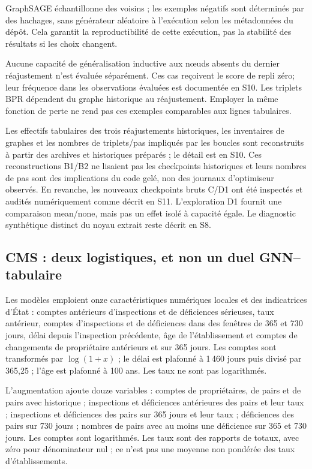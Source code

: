 \documentclass[10pt,a4paper]{article}
\begin{document}
GraphSAGE échantillonne des voisins ; les exemples négatifs sont déterminés par des hachages, sans générateur aléatoire à l'exécution selon les métadonnées du dépôt. Cela garantit la reproductibilité de cette exécution, pas la stabilité des résultats si les choix changent.

Aucune capacité de généralisation inductive aux nœuds absents du dernier réajustement n'est évaluée séparément. Ces cas reçoivent le score de repli zéro; leur fréquence dans les observations évaluées est documentée en S10. Les triplets BPR dépendent du graphe historique au réajustement. Employer la même fonction de perte ne rend pas ces exemples comparables aux lignes tabulaires.

Les effectifs tabulaires des trois réajustements historiques, les inventaires de graphes et les nombres de triplets/pas impliqués par les boucles sont reconstruits à partir des archives et historiques préparés ; le détail est en S10. Ces reconstructions B1/B2 ne lisaient pas les checkpoints historiques et leurs nombres de pas sont des implications du code gelé, non des journaux d'optimiseur observés. En revanche, les nouveaux checkpoints bruts C/D1 ont été inspectés et audités numériquement comme décrit en S11. L'exploration D1 fournit une comparaison mean/none, mais pas un effet isolé à capacité égale. Le diagnostic synthétique distinct du noyau extrait reste décrit en S8\cite{hgbcode,hgbresults,hamilton2017}.

\subsection{CMS : deux logistiques, et non un duel GNN--tabulaire}
Les modèles emploient onze caractéristiques numériques locales et des indicatrices d'État : comptes antérieurs d'inspections et de déficiences sérieuses, taux antérieur, comptes d'inspections et de déficiences dans des fenêtres de 365 et 730 jours, délai depuis l'inspection précédente, âge de l'établissement et comptes de changements de propriétaire antérieurs et sur 365 jours. Les comptes sont transformés par $\log(1+x)$ ; le délai est plafonné à 1\,460 jours puis divisé par 365,25 ; l'âge est plafonné à 100 ans. Les taux ne sont pas logarithmés.

L'augmentation ajoute douze variables : comptes de propriétaires, de pairs et de pairs avec historique ; inspections et déficiences antérieures des pairs et leur taux ; inspections et déficiences des pairs sur 365 jours et leur taux ; déficiences des pairs sur 730 jours ; nombres de pairs avec au moins une déficience sur 365 et 730 jours. Les comptes sont logarithmés. Les taux sont des rapports de totaux, avec zéro pour dénominateur nul ; ce n'est pas une moyenne non pondérée des taux d'établissements.
\end{document}
